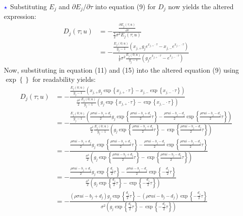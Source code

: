 \documentclass[11pt]{article}
\numberwithin{equation}{section}
\newcommand{\lc}{\left\{}
\newcommand{\rc}{\right\}}
\begin{document}
$\textcolor{blue}{\star}$ Substituting $E_j$ and $\partial E_j/\partial
\tau$ into equation (9) for $D_j$
now yields the altered expression:
\begin{align*}
    D_j(\tau;u)&=-\frac{\frac{\partial E_j(\tau;u)}{\partial \tau}}{\frac{1}{2}\sigma^2E_j(\tau;u)}\\
    &=-\frac{\frac{E_j(0;u)}{g_j-1}\left (x_{j,+}g_je^{x_{j,+}\cdot \tau} -x_{j,-}e^{x_{j,-}\cdot \tau}\right )}{\frac{1}{2}\sigma^2 \frac{E_j(0;u)}{g_j-1}\left ( g_je^{x_{j,+}\cdot \tau}-e^{x_{j,-}\cdot \tau}\right )}
\end{align*}
\newpage
Now, substituting in equation (11) and (15) into the altered equation (9) using
$\exp\lc\rc$ for readability yields:
\begin{align*}
    D_j(\tau ; u)&=-\frac{\frac{E_j(0 ; u)}{g_j-1}\left(x_{j,+} g_j \exp\left\{x_{j,+} \cdot \tau\right\}-x_{j,-} \exp\left\{x_{j,-} \cdot \tau\right\}\right)}{\frac{\sigma^2}{2} \frac{E_j(0;u)}{g_j-1}\left(g_j \exp\left\{x_{j,+} \cdot \tau\right\}-\exp\left\{x_{j,-} \cdot \tau\right\}\right)} \\
    & =-\frac{\frac{E_j(0 ; u)}{g_j-1}\left(\frac{\rho \sigma u i-b_j+d_j}{2} g_j \exp\left\{\frac{\rho \sigma u i-b_j+d_j}{2} \tau\right\}-\frac{\rho \sigma u i-b_j-d_j}{2} \exp\left\{\frac{\rho \sigma u i-b_j-d_j}{2} \tau\right\}\right)}{\frac{\sigma^2}{2} \frac{E_j(0 ; u)}{g_j-1}\left(g_j \exp\left\{\frac{\rho \sigma u i-b_j+d_j}{2} \tau\right\}-\exp\left\{\frac{\rho \sigma u i-b_j-d_j}{2} \tau\right\}\right)} \\
    & =-\frac{\frac{\rho \sigma u i-b_j+d_j}{2} g_j \exp\left\{\frac{\rho \sigma u i-b_j+d_j}{2} \tau\right\}-\frac{\rho \sigma u i-b_j-d_j}{2} \exp\left\{\frac{\rho \sigma u i-b_j-d_j}{2} \tau\right\}}{\frac{\sigma^2}{2}\left(g_j \exp\left\{\frac{\rho \sigma u i-b_j+d_j}{2} \tau\right\}-\exp\left\{\frac{\rho \sigma u i-b_j-d_j}{2} \tau\right\}\right)} \\
    & =-\frac{\frac{\rho \sigma u i-b_j+d_j}{2} g_j \exp\left\{\frac{d_j}{2} \tau\right\}-\frac{\rho \sigma u i-b_j-d_j}{2} \exp\left\{-\frac{d_j}{2} \tau\right\}}{\frac{\sigma^2}{2}\left(g_j \exp\left\{\frac{d_j}{2} \tau\right\}-\exp\left\{-\frac{d_j}{2} \tau\right\}\right)} \\
    & =-\frac{\left(\rho \sigma u i-b_j+d_j\right) g_j \exp\left\{\frac{d_j}{2} \tau\right\}-\left(\rho \sigma u i-b_j-d_j\right) \exp\left\{-\frac{d_j}{2} \tau\right\}}{\sigma^2\left(g_j \exp\left\{\frac{d_j}{2} \tau\right\}-\exp\left\{-\frac{d_j}{2} \tau\right\}\right)} \\

\end{align*}
\end{document}
